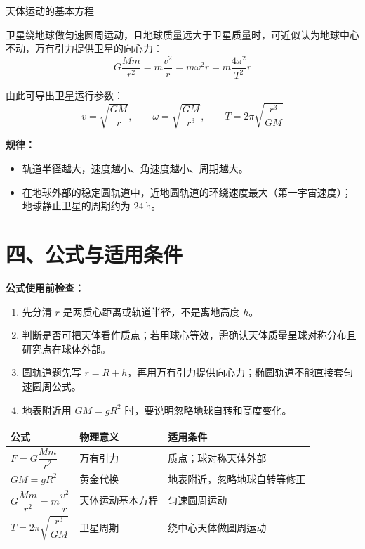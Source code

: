 \begin{conceptbox}{天体运动的基本方程}

卫星绕地球做匀速圆周运动，且地球质量远大于卫星质量时，可近似认为地球中心不动，万有引力提供卫星的向心力：
\[
\boxed{G\frac{Mm}{r^2} = m\frac{v^2}{r} = m\omega^2 r = m\frac{4\pi^2}{T^2} r}
\]

由此可导出卫星运行参数：
\[
v = \sqrt{\frac{GM}{r}},\qquad
\omega = \sqrt{\frac{GM}{r^3}},\qquad
T = 2\pi\sqrt{\frac{r^3}{GM}}
\]

\textbf{规律：}
\begin{itemize}
  \item 轨道半径越大，速度越小、角速度越小、周期越大。
  \item 在地球外部的稳定圆轨道中，近地圆轨道的环绕速度最大（第一宇宙速度）；地球静止卫星的周期约为 $24\ \mathrm{h}$。
\end{itemize}

\begin{center}


\label{fig:satellite}
\end{center}

\end{conceptbox}

\section*{四、公式与适用条件}

\textbf{公式使用前检查：}
\begin{enumerate}
  \item 先分清 $r$ 是两质心距离或轨道半径，不是离地高度 $h$。
  \item 判断是否可把天体看作质点；若用球心等效，需确认天体质量呈球对称分布且研究点在球体外部。
  \item 圆轨道题先写 $r=R+h$，再用万有引力提供向心力；椭圆轨道不能直接套匀速圆周公式。
  \item 地表附近用 $GM=gR^2$ 时，要说明忽略地球自转和高度变化。
\end{enumerate}

\begin{center}
\begin{tabular}{lll}
\toprule
公式 & 物理意义 & 适用条件 \\
\midrule
$F = G\dfrac{Mm}{r^2}$ & 万有引力 & 质点；球对称天体外部 \\
$GM = gR^2$ & 黄金代换 & 地表附近，忽略地球自转等修正 \\
$G\dfrac{Mm}{r^2} = m\dfrac{v^2}{r}$ & 天体运动基本方程 & 匀速圆周运动 \\
$T = 2\pi\sqrt{\dfrac{r^3}{GM}}$ & 卫星周期 & 绕中心天体做圆周运动 \\
\bottomrule
\end{tabular}
\end{center}


